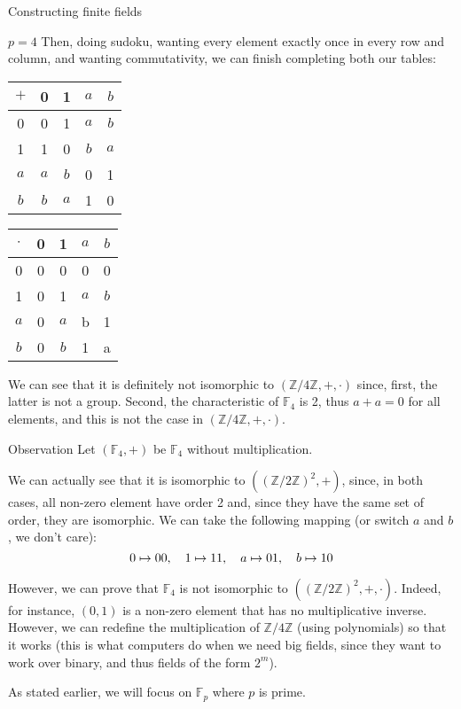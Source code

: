 \documentclass[a4paper]{article}
\begin{document}
\begin{parag}{Constructing finite fields}
\begin{subparag}{$p = 4$}
        Then, doing sudoku, wanting every element exactly once in every row and column, and wanting commutativity, we can finish completing both our tables:
        \begin{center}
            \begin{tabular}{c|cccc}
                $+$ & 0 & 1 & $a$ & $b$ \\
                \hline
                0 & 0 & 1 & $a$ & $b$\\
                1 & 1 & 0 & $b$ & $a$\\
                $a$ & $a$ & $b$ & 0 & 1\\
                $b$ & $b$ & $a$ & 1 & 0
            \end{tabular}
            \hspace{1em}
            \begin{tabular}{c|cccc}
                $\cdot$ & 0 & 1 & $a$ & $b$\\
                \hline
                0 & 0 & 0 & 0 & 0\\
                1 & 0 & 1 & $a$ & $b$ \\
                $a$ & 0 & $a$ & b & 1\\
                $b$ & 0 & $b$ & 1 & a
            \end{tabular}
        \end{center}

        We can see that it is definitely not isomorphic to $\left(\mathbb{Z} / 4\mathbb{Z}, + ,\cdot\right)$ since, first, the latter is not a group. Second, the characteristic of $\mathbb{F}_4$ is 2, thus $a + a = 0$ for all elements, and this is not the case in $\left(\mathbb{Z} / 4\mathbb{Z}, +, \cdot\right)$.
    \end{subparag}
\end{parag}

\begin{parag}{Observation}
    Let $\left(\mathbb{F}_4, +\right)$ be $\mathbb{F}_4$ without multiplication.

    We can actually see that it is isomorphic to $\left(\left(\mathbb{Z} / 2\mathbb{Z}\right)^2, +\right)$, since, in both cases, all non-zero element have order 2 and, since they have the same set of order, they are isomorphic. We can take the following mapping (or switch $a$ and $b$, we don't care): 
    \[0 \mapsto 00, \quad 1 \mapsto 11, \quad a \mapsto 01, \quad b \mapsto 10\]
    
    However, we can prove that $\mathbb{F}_4$ is not isomorphic to $\left(\left(\mathbb{Z} / 2\mathbb{Z}\right)^2, +, \cdot\right)$. Indeed, for instance, $\left(0, 1\right)$ is a non-zero element that has no multiplicative inverse. However, we can redefine the multiplication of $\mathbb{Z} / 4\mathbb{Z}$ (using polynomials) so that it works (this is what computers do when we need big fields, since they want to work over binary, and thus fields of the form $2^m$).

    As stated earlier, we will focus on $\mathbb{F}_{p}$ where $p$ is prime.
\end{parag}
\end{document}
